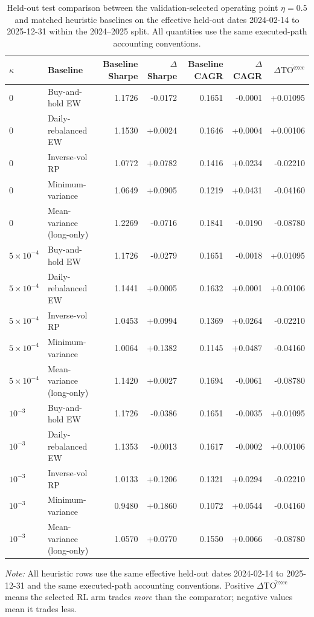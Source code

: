 \documentclass[10pt,twocolumn]{article}
\newcommand{\TOexec}{\mathrm{TO}^{\mathrm{exec}}}
\newcommand{\kappaTC}{\kappa}
\begin{document}
\begin{table}[t]
\centering
\scriptsize
\caption{Held-out test comparison between the validation-selected operating point $\eta=0.5$ and matched heuristic baselines on the effective held-out dates 2024-02-14 to 2025-12-31 within the 2024--2025 split. All quantities use the same executed-path accounting conventions.}
\label{tab:selected_vs_external}
\begin{tabular}{@{}llrrrrr@{}}
\toprule
$\kappaTC$ & Baseline & Baseline Sharpe & $\Delta$Sharpe & Baseline CAGR & $\Delta$CAGR & $\Delta\overline{\TOexec}$ \\
\midrule
$0$ & Buy-and-hold EW & 1.1726 & -0.0172 & 0.1651 & -0.0001 & +0.01095 \\
$0$ & Daily-rebalanced EW & 1.1530 & +0.0024 & 0.1646 & +0.0004 & +0.00106 \\
$0$ & Inverse-vol RP & 1.0772 & +0.0782 & 0.1416 & +0.0234 & -0.02210 \\
$0$ & Minimum-variance & 1.0649 & +0.0905 & 0.1219 & +0.0431 & -0.04160 \\
$0$ & Mean-variance (long-only) & 1.2269 & -0.0716 & 0.1841 & -0.0190 & -0.08780 \\
$5\times10^{-4}$ & Buy-and-hold EW & 1.1726 & -0.0279 & 0.1651 & -0.0018 & +0.01095 \\
$5\times10^{-4}$ & Daily-rebalanced EW & 1.1441 & +0.0005 & 0.1632 & +0.0001 & +0.00106 \\
$5\times10^{-4}$ & Inverse-vol RP & 1.0453 & +0.0994 & 0.1369 & +0.0264 & -0.02210 \\
$5\times10^{-4}$ & Minimum-variance & 1.0064 & +0.1382 & 0.1145 & +0.0487 & -0.04160 \\
$5\times10^{-4}$ & Mean-variance (long-only) & 1.1420 & +0.0027 & 0.1694 & -0.0061 & -0.08780 \\
$10^{-3}$ & Buy-and-hold EW & 1.1726 & -0.0386 & 0.1651 & -0.0035 & +0.01095 \\
$10^{-3}$ & Daily-rebalanced EW & 1.1353 & -0.0013 & 0.1617 & -0.0002 & +0.00106 \\
$10^{-3}$ & Inverse-vol RP & 1.0133 & +0.1206 & 0.1321 & +0.0294 & -0.02210 \\
$10^{-3}$ & Minimum-variance & 0.9480 & +0.1860 & 0.1072 & +0.0544 & -0.04160 \\
$10^{-3}$ & Mean-variance (long-only) & 1.0570 & +0.0770 & 0.1550 & +0.0066 & -0.08780 \\
\bottomrule
\end{tabular}
\par\vspace{2pt}\raggedright\footnotesize{\textit{Note:} All heuristic rows use the same effective held-out dates 2024-02-14 to 2025-12-31 and the same executed-path accounting conventions. Positive $\Delta\overline{\TOexec}$ means the selected RL arm trades \emph{more} than the comparator; negative values mean it trades less.}
\end{table}
\end{document}
